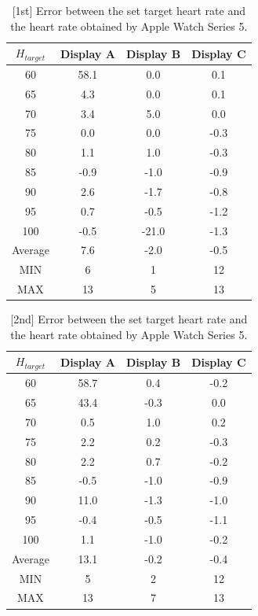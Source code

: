 \documentclass[sigchi,authordraft]{acmart}
\begin{document}
\begin{table}[!t]
  \centering
  \caption{[1st] Error between the set target heart rate and the heart rate obtained by Apple Watch Series 5.}
  \begin{tabular}{c|c|c|c} \hline\hline
    $H_{target}$ & Display A & Display B & Display C \\ \hline
    60 & 58.1 & 0.0 & 0.1 \\
    65 & 4.3 & 0.0 & 0.1 \\
    70 & 3.4 & 5.0 & 0.0 \\
    75 & 0.0 & 0.0 & -0.3 \\
    80 & 1.1 & 1.0 & -0.3 \\
    85 & -0.9 & -1.0 & -0.9 \\
    90 & 2.6 & -1.7 & -0.8 \\
    95 & 0.7 & -0.5 & -1.2 \\
    100 & -0.5 & -21.0 & -1.3 \\ \hline
    Average & 7.6 & -2.0 & -0.5 \\ \hline \hline
    MIN & 6 & 1 & 12 \\ \hline
    MAX & 13 & 5 & 13 \\ \hline
  \end{tabular}
  \label{tab:series5_result_1st}
\end{table}

\begin{table}[!t]
  \centering
  \caption{[2nd] Error between the set target heart rate and the heart rate obtained by Apple Watch Series 5.}
  \begin{tabular}{c|c|c|c} \hline\hline
    $H_{target}$ & Display A & Display B & Display C \\ \hline
    60 & 58.7 & 0.4 & -0.2 \\
    65 & 43.4 & -0.3 & 0.0 \\
    70 & 0.5 & 1.0 & 0.2 \\
    75 & 2.2 & 0.2 & -0.3 \\
    80 & 2.2 & 0.7 & -0.2 \\
    85 & -0.5 & -1.0 & -0.9 \\
    90 & 11.0 & -1.3 & -1.0 \\
    95 & -0.4 & -0.5 & -1.1 \\
    100 & 1.1 & -1.0 & -0.2 \\ \hline
    Average & 13.1 & -0.2 & -0.4 \\ \hline \hline
    MIN & 5 & 2 & 12 \\ \hline
    MAX & 13 & 7 & 13 \\ \hline
  \end{tabular}
  \label{tab:series5_result_2nd}
\end{table}
\end{document}
